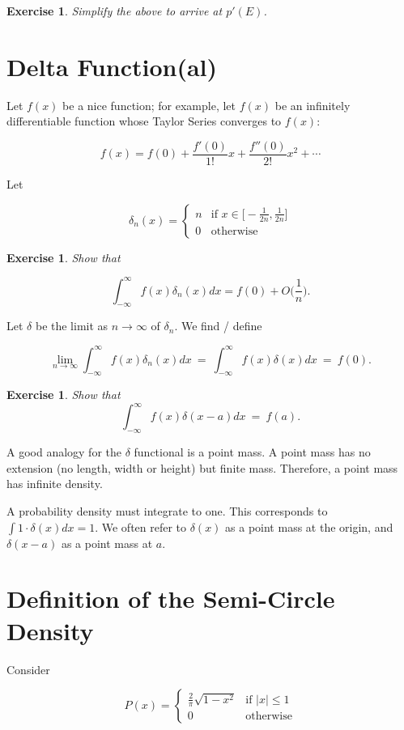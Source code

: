 \documentclass[12pt,letterpaper]{report}
\newcommand\be{\begin{equation}}
\newcommand\ee{\end{equation}}
\newtheorem{exe}[thm]{Exercise}
\newcommand{\twocase}[5]{#1 \begin{cases} #2 & \text{#3}\\ #4
&\text{#5} \end{cases}   }
\begin{document}
\begin{exe}
Simplify the above to arrive at $p'(E)$.
\end{exe}





\section{Delta Function(al)}

Let $f(x)$ be a nice function; for example, let $f(x)$ be an
infinitely differentiable function whose Taylor Series converges
to $f(x)$:

\be f(x) = f(0) + \frac{f'(0)}{1!}x + \frac{f''(0)}{2!}x^2 +
\cdots \ee

Let

\be \twocase{\delta_n(x) = }{n}{if $x \in
\Big[-\frac{1}{2n},\frac{1}{2n}\Big]$}{0}{otherwise} \ee

\begin{exe} Show that

\be \int_{-\infty}^\infty f(x) \delta_n(x) dx = f(0) + O\Big(
\frac{1}{n} \Big). \ee

\end{exe}

Let $\delta$ be the limit as $n \to \infty$ of $\delta_n$. We find
/ define

\be \lim_{n \to \infty} \int_{-\infty}^\infty f(x) \delta_n(x)dx \
= \ \int_{-\infty}^\infty f(x) \delta(x) dx \ = \ f(0). \ee

\begin{exe} Show that
\be \int_{-\infty}^\infty f(x) \delta(x-a) dx \ = \ f(a). \ee
\end{exe}

A good analogy for the $\delta$ functional is a point mass. A
point mass has no extension (no length, width or height) but
finite mass. Therefore, a point mass has infinite density.

A probability density must integrate to one. This corresponds to
$\int 1 \cdot \delta(x) dx = 1$. We often refer to $\delta(x)$ as
a point mass at the origin, and $\delta(x-a)$ as a point mass at
$a$.

\section{Definition of the Semi-Circle Density}

Consider

\be \twocase{P(x) = }{\frac{2}{\pi} \sqrt{1 - x^2}}{if $|x| \le
1$}{0}{otherwise} \ee
\end{document}
